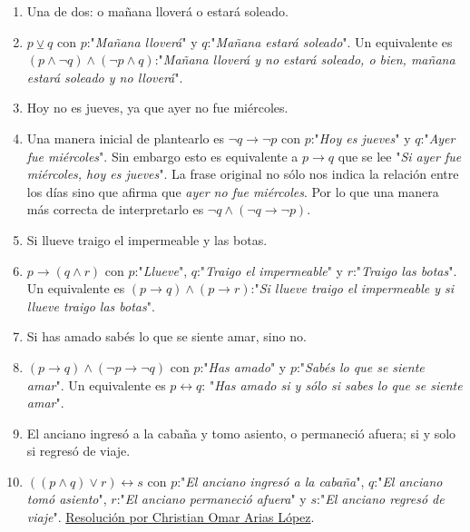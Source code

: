 \documentclass[a4paper]{article}
\newcommand{\Item}{\item[\stepcounter{enumii}$\blacktriangleright$\textbf{(\alph{enumii})}]} %
\newcommand{\answer}{\item[**]}
\newcommand{\then}{\to}
\newcommand{\eq}{\leftrightarrow}
\newcommand{\xor}{\veebar}
\begin{document}
\begin{enumerate}
\begin{multicols}{2}
\begin{enumerate} [label=(\alph*)]
		\item Una de dos: o mañana lloverá o estará soleado. 
		\answer $p \xor q$ con $p$:"\textit{Mañana lloverá}" y $q$:"\textit{Mañana estará soleado}". Un equivalente es $(p \land \neg q) \land (\neg p \land q)$:"\textit{Mañana lloverá y no estará soleado, o bien, mañana estará soleado y no lloverá}". 

		\item Hoy no es jueves, ya que ayer no fue miércoles.
		\answer Una manera inicial de plantearlo es $\neg q\then \neg p$ con $p$:"\textit{Hoy es jueves}" y $q$:"\textit{Ayer fue miércoles}". Sin embargo esto es equivalente a $p \then q$ que se lee "\textit{Si ayer fue miércoles, hoy es jueves}". La frase original no sólo nos indica la relación entre los días sino que afirma que \textit{ayer no fue miércoles}. Por lo que una manera más correcta de interpretarlo es $\neg q \land (\neg q\then \neg p)$.

		\item Si llueve traigo el impermeable y las botas. 
		\answer $p \then  ( q  \land  r )$ con $p$:"\textit{Llueve}", $q$:"\textit{Traigo el impermeable}" y $r$:"\textit{Traigo las botas}". Un equivalente es $(p \then q) \land (p \then r )$:"\textit{Si llueve traigo el impermeable y si llueve traigo las botas}".

		\item Si has amado sabés lo que se siente amar, sino no. 
		\answer $( p \then  q )  \land  ( \neg p \then  \neg q )$ con $p$:"\textit{Has amado}" y $p$:"\textit{Sabés lo que se siente amar}". Un equivalente es $p \eq  q$: "\textit{Has amado si y sólo si sabes lo que se siente amar}".

		\Item El anciano ingresó a la cabaña y tomo asiento, o permaneció afuera; si y solo si regresó de viaje.
		\answer $((p \land q) \lor r) \eq s$ con $p$:"\textit{El anciano ingresó a la cabaña}", $q$:"\textit{El anciano tomó asiento}", $r$:"\textit{El anciano permaneció afuera}" y $s$:"\textit{El anciano regresó de viaje}". \href{https://youtu.be/TgwraosKUuY?t=331}{Resolución por Christian Omar Arias López}.


\end{enumerate}
\end{multicols}
\end{enumerate}
\end{document}
